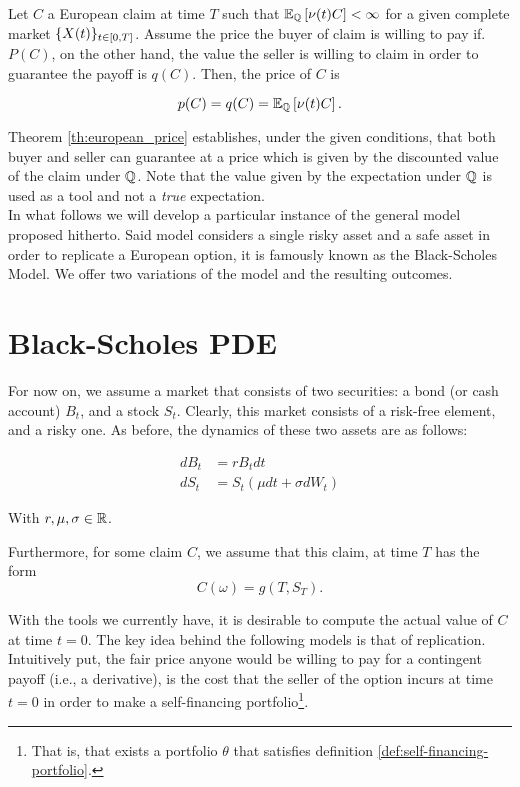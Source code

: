 \documentclass[../TGMAFFIRO.tex]{subfiles}
\begin{document}
\begin{theorem}\label{th:european_price}
	Let $C$ a European claim at time $T$ such that $\mathbb{E}_{\mathbb{Q}}\left[\nu(t)C\right] < \infty$ for a given complete market $\{X(t)\}_{t\in[0,T]}$. Assume the price the buyer of claim is willing to pay if. $P(C)$, on the other hand, the value the seller is willing to claim in order to guarantee the payoff is $q(C)$. Then, the price of $C$ is
	
	\begin{equation}
		p(C) = q(C) = \mathbb{E}_{\mathbb{Q}}\left[\nu(t)C\right].
	\end{equation}
\end{theorem}

Theorem \ref{th:european_price} establishes, under the given conditions, that both buyer and  seller can guarantee at a price which is given by the discounted value of the claim under $\mathbb{Q}$. Note that the value given by the expectation under $\mathbb{Q}$ is used as a tool and not a \textit{true} expectation.\\

In what follows we will develop a particular instance of the general model proposed hitherto. Said model considers a single risky asset and a safe asset in order to replicate a European option, it is famously known as the Black-Scholes Model. We offer two variations of the model and the resulting outcomes. 

\section{Black-Scholes PDE}
For now on, we assume a market that consists of two securities: a bond (or cash account) $B_t$, and a stock $S_t$. Clearly, this market consists of a risk-free element, and a risky one. As before, the dynamics of these two assets are as follows:

\begin{align}
	dB_t &= r B_t dt  \label{eq:bond_dynamics} \\
	dS_t &= S_t(\mu dt + \sigma dW_t) \label{eq:stock_dynamics}
\end{align}

With $r, \mu, \sigma \in \mathbb{R}$.

Furthermore, for some claim $C$, we assume that this claim, at time $T$ has the form
\begin{equation}
  C(\omega) = g(T, S_T).
\end{equation}

With the tools we currently have, it is desirable to compute the actual value of $C$ at time $t=0$. The key idea behind the following models is that of replication. Intuitively put, the fair price anyone would be willing to pay for a contingent payoff (i.e., a derivative), is the cost that the seller of the option incurs at time $t=0$ in order to make a self-financing portfolio\footnote{That is, that exists a portfolio $\theta$ that satisfies definition \ref{def:self-financing-portfolio}.}.\\
\end{document}
